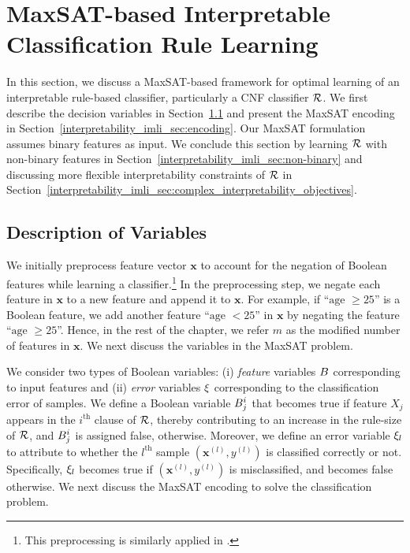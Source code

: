 \section{MaxSAT-based Interpretable Classification Rule Learning}
\label{interpretability_imli_sec:baseline}
In this section, we discuss a MaxSAT-based framework for optimal learning of an interpretable rule-based classifier, particularly a CNF classifier $ {\mathcal{R}} $. 
We first describe the decision variables in Section~\ref{interpretability_imli_sec:variables} and present the MaxSAT encoding  in Section~\ref{interpretability_imli_sec:encoding}. Our MaxSAT formulation assumes binary features as input. We
conclude this section by learning $ {\mathcal{R}} $ with non-binary features in Section~\ref{interpretability_imli_sec:non-binary} and discussing more flexible interpretability constraints of $ {\mathcal{R}} $ in Section~\ref{interpretability_imli_sec:complex_interpretability_objectives}.  



\subsection{Description of Variables}
\label{interpretability_imli_sec:variables} 
We initially preprocess feature vector $ \mathbf{x} $  to account for the negation of  Boolean features while learning a classifier.\footnote{This preprocessing is similarly applied in  \cite{malioutov2013exact}.} In the preprocessing step, we negate each feature in $ \mathbf{x} $ to a new feature and append it to $ \mathbf{x} $. For example, if ``$ \text{age }\ge 25 $'' is a Boolean feature, we add another feature ``$ \text{age }< 25 $'' in  $ \mathbf{x} $ by negating the feature ``$ \text{age }\ge 25 $''. Hence, in the rest of the chapter, we refer $ m $ as the modified number of features in $ \mathbf{x} $. We next discuss the variables in the MaxSAT problem. 

We consider two types of Boolean variables: (i) \emph{feature} variables $ B $ corresponding to input features and (ii) \emph{error} variables $ \xi $ corresponding to the classification error of samples. We define a Boolean variable $ B^i_j $ that becomes true if feature $ X_j $ appears in the $ i^\text{th} $ clause of $ {\mathcal{R}} $, thereby contributing to an increase in the rule-size of $ {\mathcal{R}} $, and $ B^i_j $ is assigned false, otherwise. Moreover, we define an error variable $ \xi_l $ to attribute to whether the $ l^\text{th} $ sample $ (\mathbf{x}^{(l)}, y^{(l)}) $ is classified correctly or not. Specifically, $ \xi_l $ becomes true if $ (\mathbf{x}^{(l)}, y^{(l)}) $ is misclassified, and becomes false otherwise.  We next discuss the MaxSAT encoding to solve the classification problem.   




